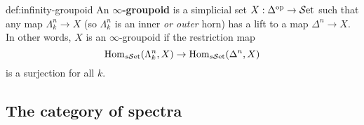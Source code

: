 \begin{definition}{def:infinity-groupoid}
	An \textbf{$\infty$-groupoid} is a simplicial set $X : \Delta^\text{op} \to {\mathcal{S}\text{et}}$ such that any map $\Lambda^n_k \to X$ (so $\Lambda^n_k$ is an inner \textit{or outer} horn) has a lift to a map $\Delta^n \to X$. In other words, $X$ is an $\infty$-groupoid if the restriction map
	\[
	{\text{Hom}}_{s{\mathcal{S}\text{et}}}(\Lambda^n_k,X)
	\to
	{\text{Hom}}_{s{\mathcal{S}\text{et}}}(\Delta^n,X) 
	\]
is a surjection for all $k$.
\end{definition}


\subsection{The category of spectra}\label{sec:spectra}

